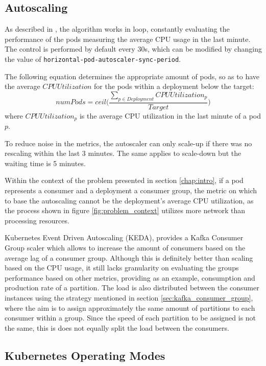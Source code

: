 \subsection{Autoscaling}

As described in \cite{KubernetesAutoscaling}, the algorithm works in loop,
constantly evaluating the performance of the pods measuring the average CPU
usage in the last minute. The control is performed by default every 30s, which
can be modified by changing the value of
\lstinline{horizontal-pod-autoscaler-sync-period}.

The following equation determines the appropriate amount of pods, so as to have
the average $CPUUtilization$ for the pods within a deployment below the target:
\begin{equation}
    numPods = ceil\bigg(\frac
        {\sum_{p \in Deployment} CPUUtilization_p}
        {Target}
    \bigg)
\end{equation}
where $CPUUtilization_p$ is the average CPU utilization in the last minute of a
pod $p$. 

To reduce noise in the metrics, the autoscaler can only scale-up if there was no
rescaling within the last 3 minutes. The same applies to scale-down but the
waiting time is 5 minutes.

Within the context of the problem presented in section \ref{chap:intro}, if a
pod represents a consumer and a deployment a consumer group, the metric on
which to base the autoscaling cannot be the deployment's average CPU
utilization, as the process shown in figure \ref{fig:problem_context} utilizes
more network than processing resources. 

Kubernetes Event Driven Autoscaling (KEDA), provides a Kafka Consumer Group
scaler which allows to increase the amount of consumers based on the average lag
of a consumer group. Although this is definitely better than scaling based on
the CPU usage, it still lacks granularity on evaluating the groups performance
based on other metrics, providing as an example, consumption and production rate
of a partition. The load is also distributed between the consumer instances
using the strategy mentioned in section \ref{sec:kafka_consumer_group}, where
the aim is to assign approximately the same amount of partitions to each
consumer within a group. Since the speed of each partition to be assigned is not
the same, this is does not equally split the load between the consumers.

\subsection{Kubernetes Operating Modes}


